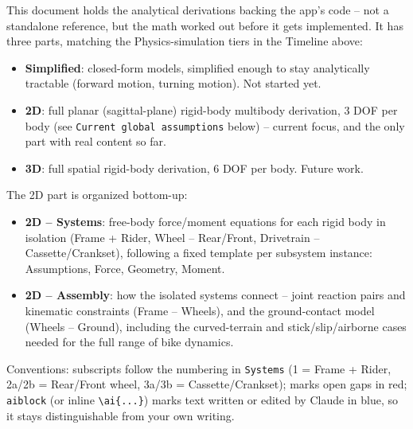 This document holds the analytical derivations backing the app's code -- not a standalone reference, but the math worked out before it gets implemented. It has three parts, matching the Physics-simulation tiers in the Timeline above:
\begin{itemize}
    \item \textbf{Simplified}: closed-form models, simplified enough to stay analytically tractable (forward motion, turning motion). Not started yet.
    \item \textbf{2D}: full planar (sagittal-plane) rigid-body multibody derivation, 3 DOF per body (see \texttt{Current global assumptions} below) -- current focus, and the only part with real content so far.
    \item \textbf{3D}: full spatial rigid-body derivation, 6 DOF per body. Future work.
\end{itemize}

The 2D part is organized bottom-up:
\begin{itemize}
    \item \textbf{2D -- Systems}: free-body force/moment equations for each rigid body in isolation (Frame + Rider, Wheel -- Rear/Front, Drivetrain -- Cassette/Crankset), following a fixed template per subsystem instance: Assumptions, Force, Geometry, Moment.
    \item \textbf{2D -- Assembly}: how the isolated systems connect -- joint reaction pairs and kinematic constraints (Frame -- Wheels), and the ground-contact model (Wheels -- Ground), including the curved-terrain and stick/slip/airborne cases needed for the full range of bike dynamics.
\end{itemize}
Conventions: subscripts follow the numbering in \texttt{Systems} (1 = Frame + Rider, 2a/2b = Rear/Front wheel, 3a/3b = Cassette/Crankset);  marks open gaps in red; \texttt{aiblock} (or inline \texttt{\textbackslash ai\{...\}}) marks text written or edited by Claude in blue, so it stays distinguishable from your own writing.
